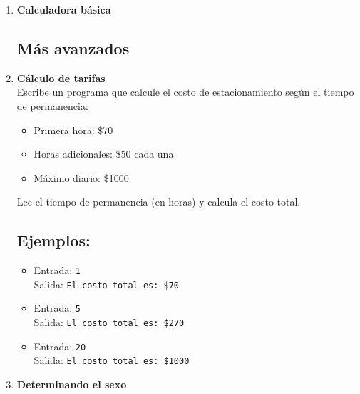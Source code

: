 \begin{enumerate}
    \item \textbf{Calculadora básica}\\
    

\subsection*{Más avanzados}
    \item \textbf{Cálculo de tarifas}\\
    Escribe un programa que calcule el costo de estacionamiento según el tiempo de permanencia:
    \begin{itemize}
        \item Primera hora: \$70
        \item Horas adicionales: \$50 cada una
        \item Máximo diario: \$1000
    \end{itemize}
    Lee el tiempo de permanencia (en horas) y calcula el costo total.
    \subsection*{Ejemplos:}
    \begin{itemize}
        \item Entrada: \texttt{1}\\
              Salida: \texttt{El costo total es: \$70}
        \item Entrada: \texttt{5}\\
              Salida: \texttt{El costo total es: \$270}
        \item Entrada: \texttt{20}\\
              Salida: \texttt{El costo total es: \$1000}
    \end{itemize}
    
    \item \textbf{Determinando el sexo}\\
    
\end{enumerate}

\newpage
